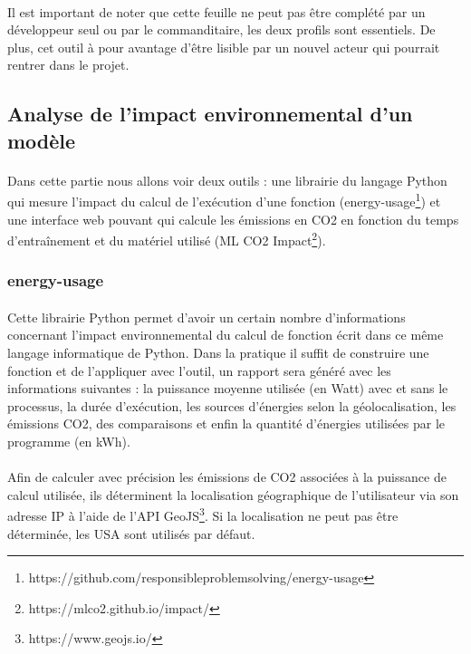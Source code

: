 \documentclass[10pt, french, a4paper]{report}
\begin{document}
\paragraph{}
Il est important de noter que cette feuille ne peut pas être complété par un développeur seul ou par le commanditaire, les deux profils sont essentiels. De plus, cet outil à pour avantage d'être lisible par un nouvel acteur qui pourrait rentrer dans le projet.

\subsection{Analyse de l'impact environnemental d'un modèle}

\paragraph{}
Dans cette partie nous allons voir deux outils : une librairie du langage Python qui mesure l'impact du calcul de l'exécution d'une fonction (energy-usage\footnote{https://github.com/responsibleproblemsolving/energy-usage}) et une interface web pouvant qui calcule les émissions en CO2 en fonction du temps d'entraînement et du matériel utilisé (ML CO2 Impact\footnote{https://mlco2.github.io/impact/}).

\subsubsection{energy-usage}
\label{subsec:energy-usage}

\paragraph{}
Cette librairie Python permet d'avoir un certain nombre d'informations concernant l'impact environnemental du calcul de fonction écrit dans ce même langage informatique de Python. Dans la pratique il suffit de construire une fonction et de l'appliquer avec l'outil, un rapport sera généré avec les informations suivantes : la puissance moyenne utilisée (en Watt) avec et sans le processus, la durée d'exécution, les sources d'énergies selon la géolocalisation, les émissions CO2, des comparaisons et enfin la quantité d'énergies utilisées par le programme (en kWh).

\paragraph{}
Afin de calculer avec précision les émissions de CO2 associées à la puissance de calcul utilisée, ils déterminent la localisation géographique de l'utilisateur via son adresse IP à l'aide de l'API GeoJS\footnote{https://www.geojs.io/}. Si la localisation ne peut pas être déterminée, les USA sont utilisés par défaut.
\end{document}
